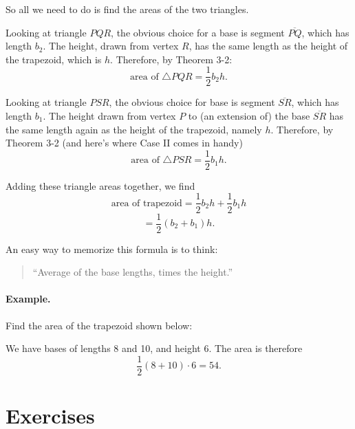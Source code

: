 \documentclass[12pt]{book} %
\begin{document}
So all we need to do is find the areas of the two triangles.

Looking at triangle $PQR$, the obvious choice for a base is segment $\overline{PQ}$, which has length $b_2$. The height, drawn from vertex $R$, has the same length as the height of the trapezoid, which is $h$. Therefore, by Theorem 3-2:
\[
\text{area of }\triangle PQR = \frac12 b_2 h.
\]

Looking at triangle $PSR$, the obvious choice for base is segment $\overline{SR}$, which has length $b_1$. The height drawn from vertex $P$ to (an extension of) the base $\overline{SR}$ has the same length again as the height of the trapezoid, namely $h$. Therefore, by Theorem 3-2 (and here's where Case II comes in handy)
\[
\text{area of }\triangle PSR = \frac12 b_1 h.
\]

Adding these triangle areas together, we find
\[
\text{area of trapezoid} = \frac12 b_2 h + \frac12 b_1 h
\]
\[
= \frac12 (b_2+b_1)h.
\]

An easy way to memorize this formula is to think:

\begin{quote}
``Average of the base lengths, times the height.''
\end{quote}

\paragraph{Example.}
Find the area of the trapezoid shown below:


We have bases of lengths 8 and 10, and height 6. The area is therefore
\[
\frac12(8+10)\cdot 6 = 54.
\]

\section*{Exercises}
\end{document}

